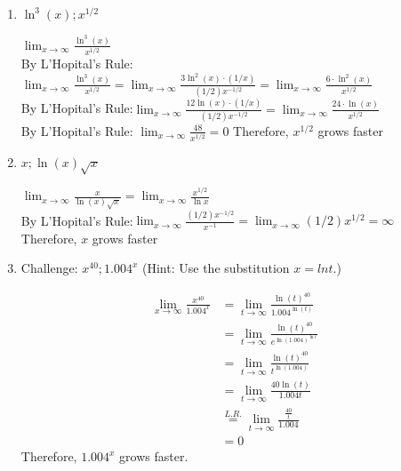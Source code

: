 \documentclass[nooutcomes]{ximera}
\begin{document}
\begin{problem}
\begin{enumerate}
\begin{freeResponse}
		\end{freeResponse}
	\item $\ln^{3} (x); x^{1/2}$
		\begin{freeResponse}
	$\lim_{x \to \infty}\frac{\ln^{3}(x)}{x^{1/2}}$\\
	By L'Hopital's Rule:$\lim_{x \to \infty}\frac{\ln^{3}(x)}{x^{1/2}}=\lim_{x \to \infty}\frac{3\ln^2 (x) \cdot (1/x)}{(1/2)x^{-1/2}}=\lim_{x \to \infty}\frac{6 \cdot \ln^2 (x)}{x^{1/2}}$\\
	By L'Hopital's Rule:$\lim_{x \to \infty}\frac{12\ln (x) \cdot (1/x)}{(1/2)x^{-1/2}}=\lim_{x \to \infty}\frac{24 \cdot \ln (x)}{x^{1/2}}$\\
	By L'Hopital's Rule: $\lim_{x \to \infty}\frac{48}{x^{1/2}}=0$
	Therefore, $x^{1/2}$ grows faster
		\end{freeResponse}
	
	\item $x; \ln(x)\sqrt{x}$
		\begin{freeResponse}
	
	$\lim_{x \to \infty}\frac{x}{\ln (x)\sqrt{x}}=\lim_{x \to \infty}\frac{x^{1/2}}{\ln x}$\\
	By L'Hopital's Rule:$\lim_{x \to \infty}\frac{(1/2)x^{-1/2}}{x^{-1}}=\lim_{x \to \infty}{(1/2)x^{1/2}}=\infty$\\
		Therefore, $x$ grows faster
		\end{freeResponse}
		
		\item Challenge: $x^{40}; 1.004^x$ (Hint: Use the substitution $x=lnt$.)
			\begin{freeResponse}
			\begin{align*}
			\lim_{x \to \infty}\frac{x^{40}}{1.004^x} &=\lim_{t \to \infty}\frac{\ln (t)^{40}}{1.004^{\ln(t)}}\\
			&=\lim_{t \to \infty}\frac{\ln (t)^{40}}{e^{\ln(1.004)^{\ln t}}}\\
			&=\lim_{t \to \infty}\frac{\ln (t)^{40}}{t^{\ln(1.004)}}\\
			&=\lim_{t \to \infty}\frac{40\ln(t)}{1.004t}\\
			&\stackrel{L.R.}{=} \lim_{t \to \infty}\frac{\frac{40}{t}}{1.004}\\
			&=0	
				\end{align*}
		Therefore, $1.004^x$ grows faster.
		\end{freeResponse}
\end{enumerate}
\end{problem}
\end{document}
